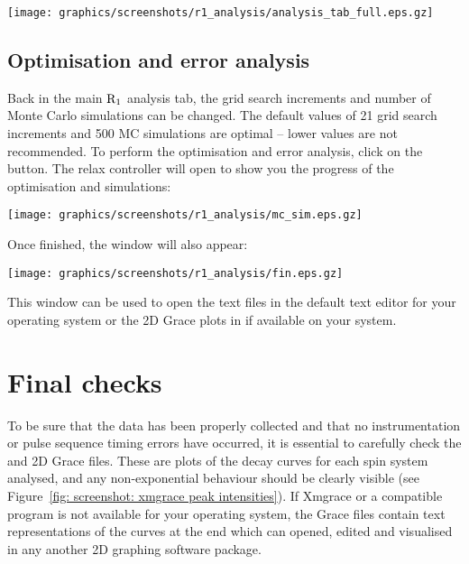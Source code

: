 \begin{minipage}[h]{\linewidth}
\centerline{\texttt{[image: graphics/screenshots/r1\_analysis/analysis\_tab\_full.eps.gz]}}
\end{minipage}



\subsection{Optimisation and error analysis}

Back in the main $\mathrm{R}_1$ analysis tab, the grid search increments and number of Monte Carlo simulations can be changed.  The default values of 21 grid search increments and 500 MC simulations are optimal -- lower values are not recommended.  To perform the optimisation and error analysis, click on the  button.  The relax controller will open to show you the progress of the optimisation and simulations:

\begin{minipage}[h]{\linewidth}
\centerline{\texttt{[image: graphics/screenshots/r1\_analysis/mc\_sim.eps.gz]}}
\end{minipage}

Once finished, the  window will also appear:

\begin{minipage}[h]{\linewidth}
\centerline{\texttt{[image: graphics/screenshots/r1\_analysis/fin.eps.gz]}}
\end{minipage}

This window can be used to open the text files in the default text editor for your operating system or the 2D Grace plots in  if available on your system.




\section{Final checks}

To be sure that the data has been properly collected and that no instrumentation or pulse sequence timing errors have occurred, it is essential to carefully check the  and  2D Grace files.  These are plots of the decay curves for each spin system analysed, and any non-exponential behaviour should be clearly visible (see Figure~\ref{fig: screenshot: xmgrace peak intensities}).  If Xmgrace or a compatible program is not available for your operating system, the Grace files contain text representations of the curves at the end which can opened, edited and visualised in any another 2D graphing software package.
 
